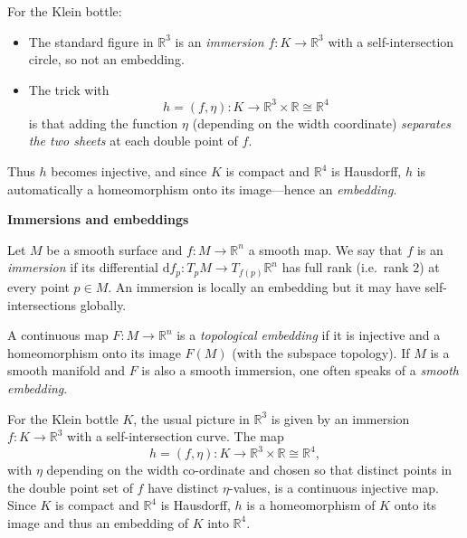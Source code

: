 \begin{solution}
For the Klein bottle:

\begin{itemize}
	\item The standard figure in $\mathbb{R}^3$ is an \emph{immersion} 
	$f : K \to \mathbb{R}^3$ with a self-intersection circle, so not an embedding.
	\item The trick with 
	\[
	h = (f,\eta) : K \to \mathbb{R}^3\times\mathbb{R}\cong\mathbb{R}^4
	\]
	is that adding the function $\eta$ (depending on the width coordinate) 
	\emph{separates the two sheets} at each double point of $f$.
\end{itemize}

Thus $h$ becomes injective, and since $K$ is compact and $\mathbb{R}^4$ is Hausdorff,
$h$ is automatically a homeomorphism onto its image---hence an \emph{embedding}.


\par\medskip\noindent\textbf{Immersions and embeddings}\par\smallskip


\begin{definition}[Immersion]
	Let $M$ be a smooth surface and $f : M \to \mathbb{R}^n$ a smooth map.
	We say that $f$ is an \emph{immersion} if its differential
	$\mathrm{d}f_p : T_pM \to T_{f(p)}\mathbb{R}^n$ has full rank
	(i.e.\ rank $2$) at every point $p\in M$.  An immersion is locally
	an embedding but it may have self-intersections globally.
\end{definition}

\begin{definition}[Embedding]
	A continuous map $F : M \to \mathbb{R}^n$ is a \emph{topological embedding}
	if it is injective and a homeomorphism onto its image $F(M)$ (with the
	subspace topology).  If $M$ is a smooth manifold and $F$ is also a smooth
	immersion, one often speaks of a \emph{smooth embedding}.
\end{definition}

For the Klein bottle $K$, the usual picture in $\mathbb{R}^3$ is given by an
immersion $f : K \to \mathbb{R}^3$ with a self-intersection curve.  The map
\[
h = (f,\eta) : K \longrightarrow \mathbb{R}^3 \times \mathbb{R}
\cong \mathbb{R}^4,
\]
with $\eta$ depending on the width co-ordinate and chosen so that distinct
points in the double point set of $f$ have distinct $\eta$-values, is a
continuous injective map.  Since $K$ is compact and $\mathbb{R}^4$ is
Hausdorff, $h$ is a homeomorphism of $K$ onto its image and thus an embedding
of $K$ into $\mathbb{R}^4$.


\end{solution}
